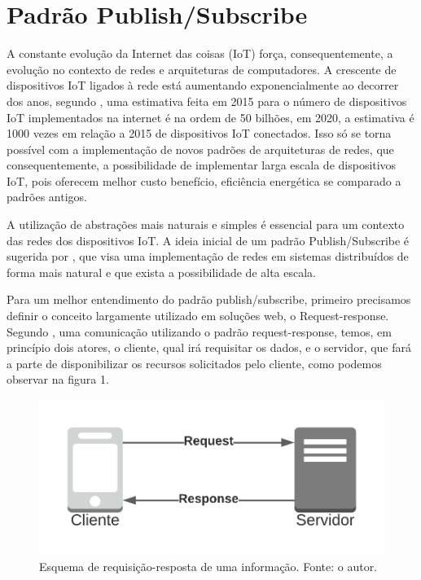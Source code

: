 \chapter{\textbf{Padrão Publish/Subscribe}} %

A constante evolução da Internet das coisas (IoT) força, consequentemente, a evolução no contexto de redes e arquiteturas de computadores. A crescente de dispositivos IoT ligados à rede está aumentando exponencialmente ao decorrer dos anos, segundo \cite{7263372}, uma estimativa feita em 2015 para o número de dispositivos IoT implementados na internet é na ordem de 50 bilhões, em 2020, a estimativa é 1000 vezes em relação a 2015 de dispositivos IoT conectados. Isso só se torna possível com a implementação de novos padrões de arquiteturas de redes, que consequentemente, a possibilidade de implementar larga escala de dispositivos IoT, pois oferecem melhor custo benefício, eficiência energética se comparado a padrões antigos.\par

A utilização de abstrações mais naturais e simples é essencial para um contexto das redes dos dispositivos IoT. A ideia inicial de um padrão Publish/Subscribe é sugerida por \cite{Birman1987}, que visa uma implementação de redes em sistemas distribuídos de forma mais natural e que exista a possibilidade de alta escala.\par


Para um melhor entendimento do padrão publish/subscribe, primeiro precisamos definir o conceito largamente utilizado em soluções web, o Request-response. Segundo \cite{Luoto2018}, uma comunicação utilizando o padrão request-response, temos, em princípio dois atores, o cliente, qual irá requisitar os dados, e o servidor, que fará a parte de disponibilizar os recursos solicitados pelo cliente, como podemos observar na figura 1.\par



\begin{figure}[H]
    \centering
	\includegraphics[scale=0.95]{topics/reqres.png}
	\caption{Esquema de requisição-resposta de uma informação. Fonte: o autor.}
\end{figure}


